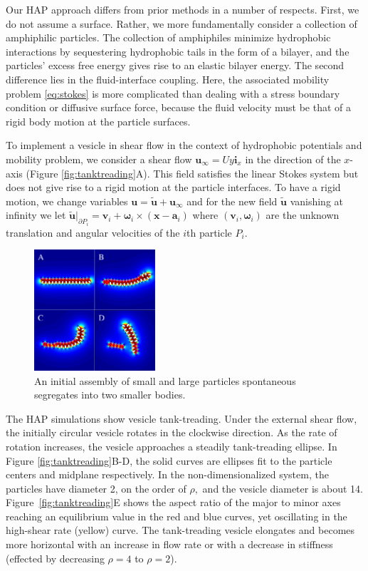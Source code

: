Our HAP approach differs from prior methods in a number of respects. 
First, we do not assume a surface. Rather, we more fundamentally  consider a collection of amphiphilic particles.
The collection of amphiphiles minimize hydrophobic interactions by sequestering hydrophobic tails in the form of a bilayer, and the particles' excess free energy gives rise to an elastic bilayer energy. 
The second difference lies in the fluid-interface coupling. Here, the associated mobility problem \eqref{eq:stokes} 
is more complicated than dealing with a stress boundary condition or diffusive surface force, 
because the fluid velocity must be that of a rigid body motion at the particle surfaces.

To implement a vesicle in shear flow in the context of hydrophobic potentials and mobility problem, 
we consider a shear flow $\mathbf{u}_{\infty} = Uy\mathbf{i}_x$ in the direction of the $x$-axis
(Figure \ref{fig:tanktreading}A).
This field satisfies the linear Stokes system but does not give rise to a rigid motion at the particle interfaces. 
To have a rigid motion, we change variables $\mathbf{u} = \tilde{\mathbf{u}}+ \mathbf{u}_{\infty}$ and 
for the new field $\tilde{\mathbf{u}}$ vanishing at infinity we let 
$\tilde{\mathbf{u}}|_{\partial P_i} = \mathbf{v}_i + \boldsymbol{\omega}_i \times (\mathbf{x} - \mathbf{a}_i)$ 
where $(\mathbf{v}_i,\boldsymbol{\omega}_i)$ are the unknown translation and angular velocities of the 
$i$th particle $P_i.$  

\begin{figure}
\centerline{\includegraphics[width=0.4\textwidth]{figures/PW_fig2.pdf}}
\caption{\label{fig:demixing} An initial assembly of small and 
large particles spontaneous segregates into two smaller bodies. }
\end{figure}
The HAP simulations show vesicle tank-treading. Under the external shear flow, the initially circular 
vesicle rotates in the clockwise direction. As the rate of rotation increases, the vesicle approaches
a steadily tank-treading ellipse. In Figure \ref{fig:tanktreading}B-D, the solid curves are ellipses fit to the particle centers
and midplane respectively. In the non-dimensionalized system, the particles have diameter 2, on the order of $\rho,$ 
and the vesicle diameter is about 14. 
Figure~\ref{fig:tanktreading}E shows the aspect ratio of the major to minor axes reaching an equilibrium value in the 
red and blue curves, yet oscillating in the high-shear rate (yellow) curve.
The tank-treading vesicle elongates and becomes more horizontal 
with an increase in flow rate or 
with a decrease in stiffness (effected by decreasing $\rho = 4$ to $\rho = 2$). 



